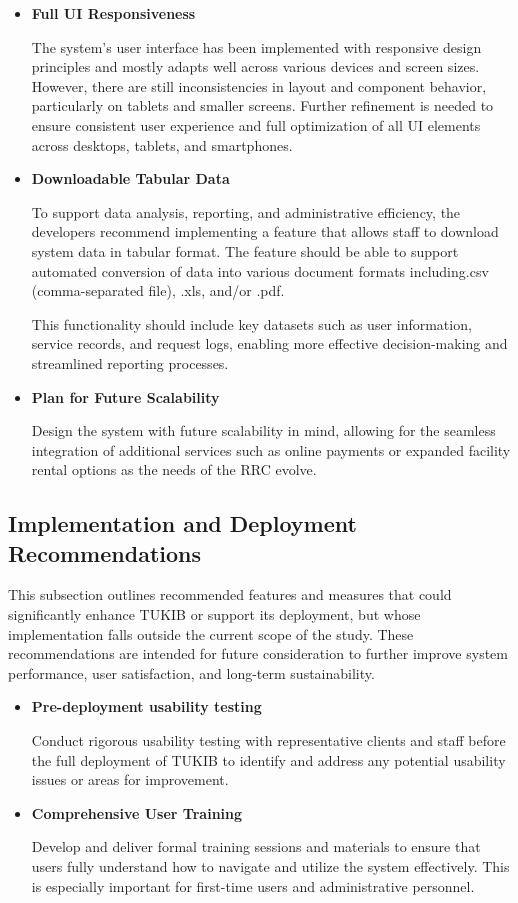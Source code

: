 \begin{itemize}
	\item \textbf{Full UI Responsiveness}
	
	The system’s user interface has been implemented with responsive design principles and mostly adapts well across various devices and screen sizes. However, there are still inconsistencies in layout and component behavior, particularly on tablets and smaller screens. Further refinement is needed to ensure consistent user experience and full optimization of all UI elements across desktops, tablets, and smartphones.
	
	\item \textbf{Downloadable Tabular Data}
	
	To support data analysis, reporting, and administrative efficiency, the developers recommend implementing a feature that allows staff to download system data in tabular format. The feature should be able to support automated conversion of data into various document formats including.csv (comma-separated file), .xls,	and/or .pdf.
	
	 This functionality should include key datasets such as user information, service records, and request logs, enabling more effective decision-making and streamlined reporting processes.
	
	\item \textbf{Plan for Future Scalability}
	
	Design the system with future scalability in mind, allowing for the seamless integration of additional services such as online payments or expanded facility rental options as the needs of the RRC evolve.
	
\end{itemize}

\subsection{Implementation and Deployment Recommendations}

This subsection outlines recommended features and measures that could significantly enhance TUKIB or support its deployment, but whose implementation falls outside the current scope of the study. These recommendations are intended for future consideration to further improve system performance, user satisfaction, and long-term sustainability.

\begin{itemize}
	
	\item \textbf{Pre-deployment usability testing}
	
	Conduct rigorous usability testing with representative clients and staff before the full deployment of TUKIB to identify and address any potential usability issues or areas for improvement.
	
	\item \textbf{Comprehensive User Training}
	
	Develop and deliver formal training sessions and materials to ensure that users fully understand how to navigate and utilize the system effectively. This is especially important for first-time users and administrative personnel.
	
\end{itemize}